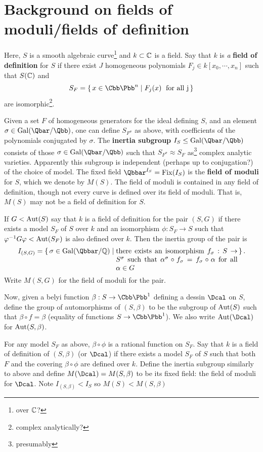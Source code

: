 \documentclass[11pt]{amsart}
\newcommand{\CP}{\Cbb \Pbb}
\newcommand{\CPone}{\Cbb \Pbb^1}
\begin{document}
\section*{Background on fields of moduli/fields of definition}
Here, $S$ is a smooth algebraic curve\footnote{over $\mathbb{C}$?} and $k \subset \mathbb{C}$ is a field. Say that $k$ is \emph{a} \textbf{field of definition} for $S$ if there exist $J$ homogeneous polynomials $F_j\in k[x_0, \cdots, x_n]$ such that $S(\mathbb{C})$ and
		\[S_F= \set{x\in \CP^n \mid F_j(x) \; \text{ for all j}}\]
are isomorphic\footnote{complex analytically?}.

Given a set $F$ of homogeneous generators for the ideal defining  $S$, and an element $\sigma \in  \Gal(\Qbar / \Qbb)$,  one can define $S_{ F^\sigma}$ as above, with coefficients of the polynomials conjugated by $\sigma$. The \textbf{inertia subgroup}  $I_S \leq \Gal ( \Qbar / \Qbb)$  consists of those $\sigma \in \Gal(\Qbar/\Qbb)$ such that $S_{F^\sigma} \approx S_F$  as\footnote{presumably} complex analytic varieties. Apparently this subgroup is independent (perhaps up to conjugation?) of the choice of model.  The fixed field $\Qbbar^{I_S}= \Fix(I_S)$ is the \textbf{field of moduli} for $S$, which we denote by $M(S)$.  The field of moduli is contained in any field of definition, though not every curve is defined over its field of moduli. That is, $M(S)$ may not be a field of definition for $S$.

If $G<\operatorname{Aut}(S)$ say that $k$ is a field of definition for the pair $(S,G)$ if there exists a model $S_F$ of $S$ over $k$ and an isomorphism $\phi:S_F \to S$ such that $\varphi^{-1} G \varphi < \operatorname{Aut}(S_F)$ is also defined over $k$. Then the inertia group of the pair is
\[ I_{(S,G)} =  \set{\sigma \in \Gal(\Qbbar/\Q) \mid \parbox[t]{.5\linewidth}{ there exists an isomorphism $f_\sigma: S\to S^\sigma$ such that $\alpha^\sigma \circ f_\sigma = f_\sigma \circ \alpha$ for all $\alpha \in G$}}. \]
Write $M(S,G)$ for the field of moduli for the pair.

Now, given a belyi function $\beta:S\to \CPone$ defining a dessin $\Dcal$ on $S$, define the group of automorphisms of $(S,\beta)$ to be the subgroup of $\operatorname{Aut}(S)$ such that $\beta\circ f= \beta$ (equality of functions $S\to \CPone$). We also write $\Aut(\Dcal)$ for $\operatorname{Aut}(S,\beta)$.

For any model $S_F$ as above, $\beta \circ \phi$ is a rational function on $S_F$. Say that $k$ is a field of definition of $(S,\beta)$ (or $\Dcal$) if there exists a model $S_F$ of $S$ such that both $F$ and the covering $\beta \circ \phi$ are defined over $k$. Define the inertia subgroup similarly to above and define $M(\Dcal)=M(S,\beta)$ to be its fixed field: the field of moduli for $\Dcal$. Note $I_(S,\beta) < I_S$ so $M(S)< M(S,\beta)$
\end{document}
